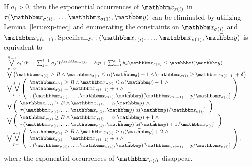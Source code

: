 If $a_i > 0$, then the exponential occurrences of $\ivarx_{\sigma(i)}$ in $\tau(\ivarx_{\sigma(i)}, \ldots, \ivarx_{\sigma(1)}, \vec{\ivary})$ can be eliminated by utilizing  Lemma~\ref{lem:exp-ineq} and enumerating the constraints on $\ivarx_{\sigma(i)}$ and $\ivarx_{\sigma(i-1)}$. Specifically, 
$\tau(\ivarx_{\sigma(i)}, \ldots, \ivarx_{\sigma(1)}, \vec{\ivary})$ is equivalent to 
\[
\small
\begin{array}{l}
\bigvee \limits_{p=0}^{B-1} a_i 10^{p}+\sum_{j=1}^{i-1} a_j 10^{\ivarx_{\sigma(j)}} + b_i p + \sum_{k=1}^{i-1}b_k \ivarx_{\sigma(k)} \le \iterm(\vec{\ivary}) \\
\bigvee \big(\ivarx_{\sigma(i)} \ge B \wedge \ivarx_{\sigma(i)} \le \alpha(\vec{\ivary})  -1  \wedge \ivarx_{\sigma(i)} \ge \ivarx_{\sigma(i-1)} +\delta \big)\\
%
\bigvee \bigvee \limits_{p=0}^{\delta-1} 
\left(
\begin{array}{l}
\ivarx_{\sigma(i)} \ge B \wedge \ivarx_{\sigma(i)} \le \alpha(\vec{\ivary})  -1 \ \wedge \\
 \ivarx_{\sigma(i)} = \ivarx_{\sigma(i-1)} +p\ \wedge\\
 \tau(\ivarx_{\sigma(i)}, \ldots, \ivarx_{\sigma(1)}, \vec{\ivary})[\ivarx_{\sigma(i-1)} + p /\ivarx_{\sigma(i)}] 
\end{array}
\right)\\
\bigvee 
\left(
\begin{array}{l}
\ivarx_{\sigma(i)} \ge B \wedge \ivarx_{\sigma(i)} = \alpha(\vec{\ivary})\ \wedge \\
\tau(\ivarx_{\sigma(i)}, \ldots, \ivarx_{\sigma(1)}, \vec{\ivary})[\alpha(\vec{\ivary})/\ivarx_{\sigma(i)}]
\end{array}
\right)  \\
\bigvee 
\left(
\begin{array}{l}
\ivarx_{\sigma(i)} \ge B \wedge \ivarx_{\sigma(i)} = \alpha(\vec{\ivary})+1\ \wedge \\
\tau(\ivarx_{\sigma(i)}, \ldots, \ivarx_{\sigma(1)}, \vec{\ivary})[\alpha(\vec{\ivary})+1/\ivarx_{\sigma(i)}]
\end{array}
\right)  \\
\bigvee \bigvee \limits_{p=0}^{\delta-1} 
\left(
\begin{array}{l}
\ivarx_{\sigma(i)} \ge B \wedge \ivarx_{\sigma(i)} \ge \alpha(\vec{\ivary})+2\ \wedge\\
 \ivarx_{\sigma(i)} = \ivarx_{\sigma(i-1)} +p\ \wedge \\
 \tau(\ivarx_{\sigma(i)}, \ldots, \ivarx_{\sigma(1)}, \vec{\ivary})[\ivarx_{\sigma(i-1)}+ p /\ivarx_{\sigma(i)}]
\end{array}
\right),
\end{array}
\]
where the exponential occurrences of $\ivarx_{\sigma(i)}$ disappear.  

